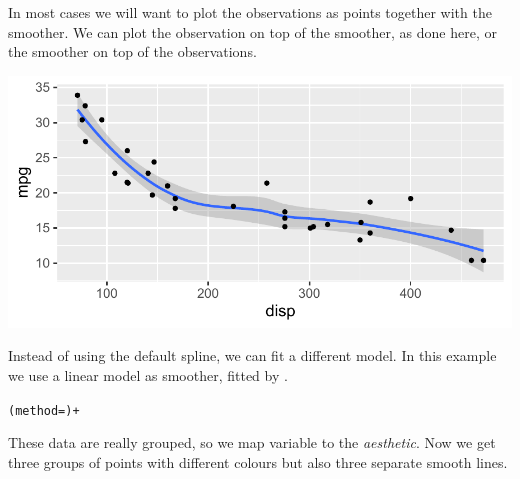 \documentclass[krantz2]{krantz}\usepackage{knitr}
\begin{document}
In most cases we will want to plot the observations as points together with the smoother. We can plot the observation on top of the smoother, as done here, or the smoother on top of the observations.

\begin{knitrout}\footnotesize
{}\color{fgcolor}\begin{kframe}
\begin{alltt}
\hlstd{(}  \hlstd{(}    \hlopt{+}
  \hlstd{()} \hlopt{+}
  \hlstd{()}
\end{alltt}


{\ttfamily\noindent\itshape{}}\end{kframe}

{\centering \includegraphics[width=.7\textwidth]{figure/pos-smooth-plot-02-1} 

}



\end{knitrout}

Instead of using the default spline, we can fit a different model. In this example we use a linear model as smoother, fitted by .

\begin{knitrout}\footnotesize
{}\color{fgcolor}\begin{kframe}
\begin{alltt}
  (method=) +
\end{alltt}
\end{kframe}
\end{knitrout}

These data are really grouped, so we map variable  to the  \emph{aesthetic}. Now we get three groups of points with different colours but also three separate smooth lines.
\end{document}

